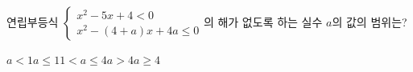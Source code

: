 연립부등식 $\begin{cases} x^2-5x+4<0 \\ x^2-(4+a)x+4a\le 0 \end{cases}$의 해가 없도록 하는 실수 $a$의 값의 범위는?
\begin{choices32}{$a<1$}{$a\le 1$}{$1<a\le 4$}{$a>4$}{$a\ge 4$}\end{choices32}
